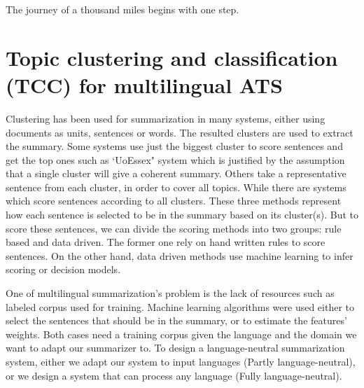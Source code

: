 \begin{savequote}[75mm] 
The journey of a thousand miles begins with one step.
\end{savequote}

\chapter{Topic clustering and classification (TCC) for multilingual ATS}
\label{chap:tcc}


Clustering has been used for summarization in many systems, either using documents as units, sentences or words. 
The resulted clusters are used to extract the summary.
Some systems use just the biggest cluster to score sentences and get the top ones such as `UoEssex" system \citep{11-elhaj-al} which is justified by the assumption that a single cluster will give a coherent summary. 
Others take a representative sentence from each cluster, in order to cover all topics. 
While there are systems which score sentences according to all clusters.
These three methods represent how each sentence is selected to be in the summary based on its cluster(s). 
But to score these sentences, we can divide the scoring methods into two groups: rule based and data driven. 
The former one rely on hand written rules to score sentences. %
On the other hand, data driven methods use machine learning to infer scoring or decision models. 

One of multilingual summarization's problem is the lack of resources such as labeled corpus used for training.
Machine learning algorithms were used either to select the sentences that should be in the summary, or to estimate the features' weights. 
Both cases need a training corpus given the language and the domain we want to adapt our summarizer to. 
To design a language-neutral summarization system, either we adapt our system to input languages (Partly language-neutral), or we design a system that can process any language (Fully language-neutral). 

